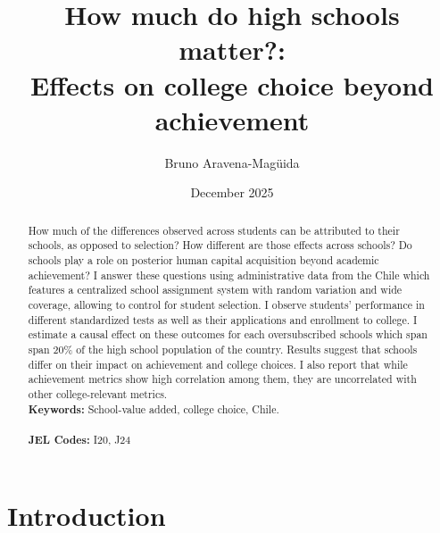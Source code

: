 \documentclass[12pt]{article}
\begin{document}
\begin{titlepage}
\title{How much do high schools matter?: \\  Effects on college choice beyond achievement}
\author{Bruno Aravena-Magüida }
\date{December 2025}
\maketitle
\begin{abstract}
How much of the differences observed across students can be attributed to their schools, as opposed to selection? How different are those effects across schools?  Do schools play a role on posterior human capital acquisition beyond academic achievement? I answer these questions using administrative data from the Chile which features a centralized school assignment system with random variation and wide coverage, allowing to control for student selection.  I observe students' performance in different standardized tests as well as their applications and enrollment to college.  I estimate a causal effect on these outcomes for each oversubscribed schools which span span 20\% of the high school population of the country. Results suggest that schools differ on their impact on achievement and college choices. I also report that while achievement metrics show high correlation among them, they are uncorrelated with other college-relevant metrics. 
\noindent \vspace{1cm}
\\
\noindent\textbf{Keywords:} School-value added, college choice, Chile.\\
\vspace{0in}\\
\noindent\textbf{JEL Codes:} I20, J24 \\
\bigskip
\end{abstract}

\setcounter{page}{0}
\thispagestyle{empty}
\end{titlepage}
\pagebreak \newpage


\doublespacing

\section{Introduction}
\end{document}
